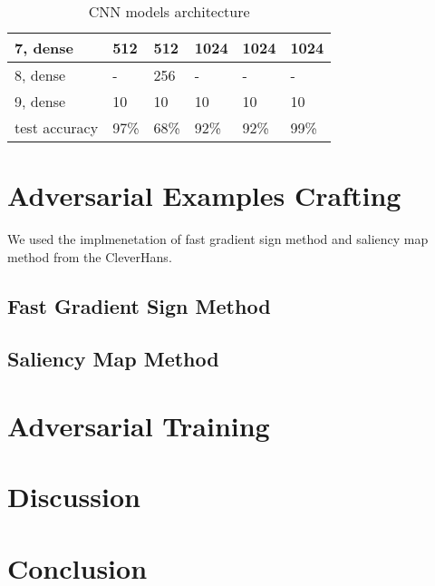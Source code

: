\documentclass{article}
\begin{document}
\begin{table}
\begin{tabular}{llllll}
    7, dense &
        512 &
        512 &
        1024 &
        1024 &
        1024 \\
    \midrule

    8, dense &
        - &
        256 &
        - &
        - &
        - \\
    \midrule

    9, dense &
        10 &
        10 &
        10 &
        10 &
        10 \\

    \midrule

    test accuracy &
        97\% &
        68\% &
        92\% &
        92\% &
        99\% \\

    \bottomrule
\end{tabular}
\caption{\label{tab:cnnarch} CNN models architecture}
\end{table}


\section{Adversarial Examples Crafting}

We used the implmenetation of fast gradient sign method and saliency map method from the CleverHans\cite{cleverhans}.

\subsection{Fast Gradient Sign Method}


\subsection{Saliency Map Method}


\section{Adversarial Training}


\section{Discussion}


\section{Conclusion}
\end{document}
